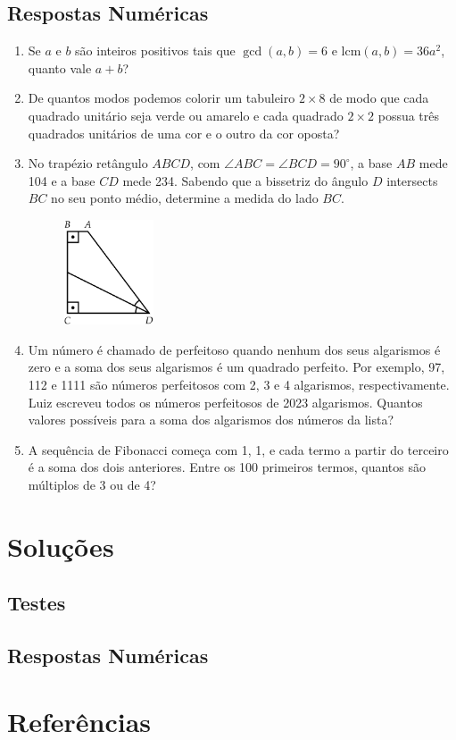 \documentclass[12pt]{article}
\begin{document}
    \subsection{Respostas Numéricas}
      \begin{enumerate}[label=\textbf{\arabic*.}, start=16]
      \item Se \(a\) e \(b\) são inteiros positivos tais que \(\gcd(a,b) = 6\) e \(\mathrm{lcm}(a,b) = 36a^2\), quanto vale \(a+b\)?
      \item De quantos modos podemos colorir um tabuleiro \(2\times8\) de modo que cada quadrado unitário seja verde ou amarelo e cada 
        quadrado \(2\times2\) possua três quadrados unitários de uma cor e o outro da cor oposta?
      \item No trapézio retângulo \(ABCD\), com \(\angle ABC = \angle BCD = 90^\circ\), a base \(AB\) mede 104 e a base \(CD\) mede 234.
        Sabendo que a bissetriz do ângulo \(D\) intersects \(BC\) no seu ponto médio, determine a medida do lado \(BC\).
        \begin{figure}[h]
          \centering
          \includegraphics[width=0.25\textwidth]{third.png}
        \end{figure}
      \item Um número é chamado de perfeitoso quando nenhum dos seus algarismos é zero e a soma dos seus algarismos é um quadrado perfeito.
        Por exemplo, 97, 112 e 1111 são números perfeitosos com 2, 3 e 4 algarismos, respectivamente. Luiz escreveu todos os números 
        perfeitosos de 2023 algarismos. Quantos valores possíveis para a soma dos algarismos dos números da lista?
      \item A sequência de Fibonacci começa com 1, 1, e cada termo a partir do terceiro é a soma dos dois anteriores. Entre os 100 primeiros 
        termos, quantos são múltiplos de 3 ou de 4?
      \end{enumerate}

  \clearpage

  \section{\textsf{Soluções}}
    \subsection{Testes}
    \subsection{Respostas Numéricas}

  \clearpage

  \section{\textsf{Referências}}
\end{document}
